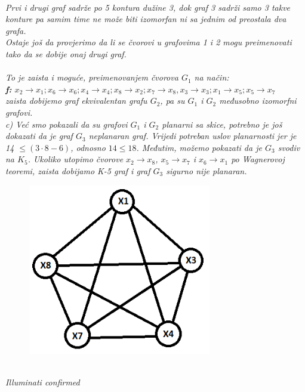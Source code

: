 \documentclass[12pt]{article}
\begin{document}
\begin{enumerate}
\begin{center}
\vspace{0.5cm}
\textit{\\Prvi i drugi graf sadrže po 5 kontura dužine 3, dok graf 3 sadrži samo 3 takve konture pa samim time ne može biti izomorfan ni sa jednim od preostala dva grafa.\\Ostaje još da provjerimo da li se čvorovi u grafovima 1 i 2 mogu preimenovati tako da se dobije onaj drugi graf.}\\
\vspace{0.5cm}
    \textit{\\To je zaista i moguće, preimenovanjem čvorova $G_1$ na način:\\ \textbf{f:} $x_2 \rightarrow x_1; x_6 \rightarrow x_6; x_4 \rightarrow x_4; x_8 \rightarrow x_2; x_7 \rightarrow x_8, x_3 \rightarrow x_3; x_1 \rightarrow x_5; x_5 \rightarrow x_7$\\zaista dobijemo graf ekvivalentan grafu $G_2$, pa su $G_1$ i $G_2$ međusobno izomorfni grafovi.\\
    \vspace{0.5cm}
    c) Već smo pokazali da su grafovi $G_1$ i $G_2$ planarni sa skice, potrebno je još dokazati da je graf $G_3$ neplanaran graf. Vrijedi potreban uslov planarnosti jer je 14 $\leq (3 \cdot 8 - 6)$, odnosno $14 \leq 18$. Međutim, možemo pokazati da je $G_3$ svodiv na $K_5$. Ukoliko utopimo čvorove $x_2 \rightarrow x_8$, $x_5 \rightarrow x_7$ i $x_6 \rightarrow x_1$ po Wagnerovoj teoremi, zaista dobijamo K-5 graf i graf $G_3$ sigurno nije planaran.
    }
    
    \begin{figure}[htp]
    \centering
    \includegraphics[width=8cm]{k5graf.png}
\end{figure}
    \\
    \textit{Illuminati confirmed}\\
    

\end{center}
\end{enumerate}
\end{document}
